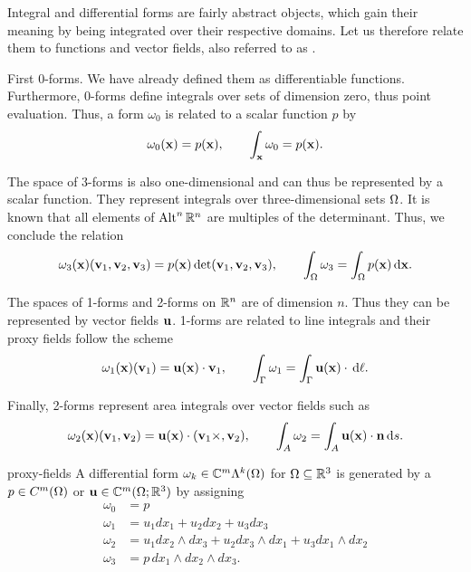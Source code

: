 \begin{remark}
  \label{remark:proxy-fields}
  Integral and differential forms are fairly abstract objects, which
  gain their meaning by being integrated over their respective
  domains. Let us therefore relate them to functions and vector
  fields, also referred to as .

  First 0-forms. We have already defined them as differentiable
  functions. Furthermore, 0-forms define integrals over sets of
  dimension zero, thus point evaluation.
  Thus, a form $\omega_0$ is related to a scalar function $p$ by
  \begin{gather}
    \omega_0(\mathbf x) = p(\mathbf x),\qquad \int_\mathbf x \omega_0 = p(\mathbf x).
  \end{gather}

  The space of 3-forms is also one-dimensional and can thus be
  represented by a scalar function. They represent integrals over
  three-dimensional sets $\Omega$. It is known that all elements of
  $\operatorname{Alt}^n\mathbb R^n$ are multiples of the determinant. Thus, we conclude the
  relation
  \begin{gather}
    \omega_3(\mathbf x)(\mathbf v_1,\mathbf v_2,\mathbf v_3) = p(\mathbf x) \det(\mathbf v_1,\mathbf v_2,\mathbf v_3)
    ,\qquad \int_\Omega \omega_3 = \int_\Omega p(\mathbf x) \,\mathrm{d} \mathbf x.
  \end{gather}

  The spaces of 1-forms and 2-forms on $\mathbb R^n$ are of dimension
  $n$. Thus they can be represented by vector fields $\mathbf u$. 1-forms are
  related to line integrals and their proxy fields follow the scheme
  \begin{gather}
    \omega_1(\mathbf x)(\mathbf v_1) = \mathbf u(\mathbf x) \cdot \mathbf v_1
    ,\qquad \int_\Gamma \omega_1 = \int_\Gamma \mathbf u(\mathbf x) \cdot \,\mathrm{d} \ell.
  \end{gather}

  Finally, 2-forms represent area integrals over vector fields such as
  \begin{gather}
    \omega_2(\mathbf x)(\mathbf v_1,\mathbf v_2) = \mathbf u(\mathbf x) \cdot (\mathbf v_1 \times ,\mathbf v_2)
    ,\qquad \int_A \omega_2 = \int_A \mathbf u(\mathbf x) \cdot \mathbf n \,\mathrm{d} s.
  \end{gather}
\end{remark}

\begin{Definition}{proxy-fields}
  A differential form $\omega_k \in \mathbb C^m\Lambda^k(\Omega)$ for
  $\Omega \subseteq \mathbb R^3$ is generated by a 
  $p\in C^m(\Omega)$ or $\mathbf u\in\mathbb C^m(\Omega;\mathbb R^3)$ by assigning
  \begin{align}
    \omega_0 &= p\\
    \omega_1 &= u_1 dx_1 + u_2 dx_2 + u_3 dx_3\\
    \omega_2 &= u_1 dx_2\wedge dx_3 + u_2 dx_3 \wedge dx_1 + u_3 dx_1 \wedge dx_2\\
    \omega_3 &= p \, dx_1 \wedge dx_2 \wedge dx_3.
  \end{align}
\end{Definition}

